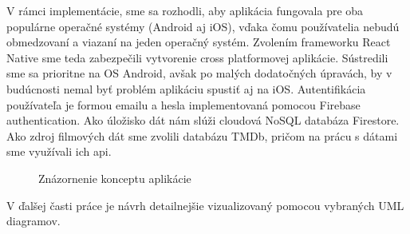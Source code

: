 V rámci implementácie, sme sa rozhodli, aby aplikácia fungovala pre oba populárne operačné systémy (Android aj iOS), vďaka čomu používatelia nebudú obmedzovaní a viazaní na jeden operačný systém. Zvolením frameworku React Native sme teda zabezpečili vytvorenie cross platformovej aplikácie. Sústredili sme sa prioritne na OS Android, avšak po malých dodatočných úpravách, by v budúcnosti nemal byť problém aplikáciu spustiť aj na iOS. Autentifikácia používateľa je formou emailu a hesla implementovaná pomocou Firebase authentication. Ako úložisko dát nám slúži cloudová NoSQL databáza Firestore. Ako zdroj filmových dát sme zvolili databázu TMDb, pričom na prácu s dátami sme využívali ich \acrshort{api}. 
\vspace{55mm} %

\begin{figure}[hbt!]
  \centering  
  \def\stackalignment{c}
           {\scriptsize}
	\caption{Znázornenie konceptu aplikácie}  
  \label{app-diagram}
\end{figure}

V ďalšej časti práce je návrh detailnejšie vizualizovaný pomocou vybraných UML diagramov. 

\pagebreak

